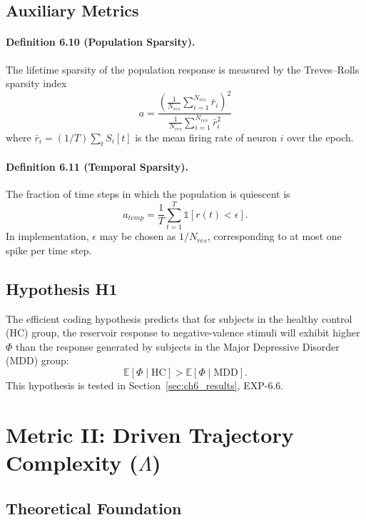 \subsection{Auxiliary Metrics}

\paragraph{Definition 6.10 (Population Sparsity).}
The lifetime sparsity of the population response is measured by the Treves--Rolls sparsity index
\begin{equation}
a = \frac{\left(\frac{1}{N_{res}}\sum_{i=1}^{N_{res}} \bar{r}_i\right)^2}{\frac{1}{N_{res}}\sum_{i=1}^{N_{res}} \bar{r}_i^2}
\end{equation}
where $\bar{r}_i=(1/T)\sum_t S_i[t]$ is the mean firing rate of neuron $i$ over the epoch.

\paragraph{Definition 6.11 (Temporal Sparsity).}
The fraction of time steps in which the population is quiescent is
\begin{equation}
a_{temp}=\frac{1}{T}\sum_{t=1}^{T} \mathbb{1}[r(t)<\epsilon].
\end{equation}
In implementation, $\epsilon$ may be chosen as $1/N_{res}$, corresponding to at most one spike per time step.

\subsection{Hypothesis H1}
The efficient coding hypothesis predicts that for subjects in the healthy control (HC) group, the reservoir response to negative-valence stimuli will exhibit higher $\Phi$ than the response generated by subjects in the Major Depressive Disorder (MDD) group:
\begin{equation}
\mathbb{E}[\Phi\mid \mathrm{HC}] > \mathbb{E}[\Phi\mid \mathrm{MDD}].
\end{equation}
This hypothesis is tested in Section~\ref{sec:ch6_results}, EXP-6.6.

\section{Metric II: Driven Trajectory Complexity ($\Lambda$)}
\label{sec:dynamics_lambda}

\subsection{Theoretical Foundation}

